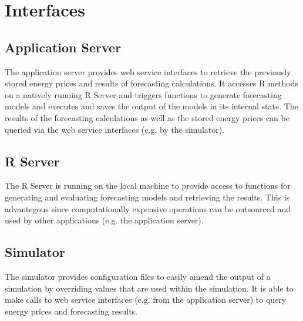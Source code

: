\documentclass[paper=a4, fontsize=11pt]{scrartcl} %
\numberwithin{equation}{section} %
\numberwithin{figure}{section} %
\numberwithin{table}{section} %
\begin{document}
\section{Interfaces}


\subsection{Application Server}

The application server provides web service interfaces to retrieve the previously stored energy prices and results of forecasting calculations. It accesses R methods on a natively running R Server and triggers functions to generate forecasting models and executes and saves the output of the models in its internal state. The results of the forecasting calculations as well as the stored energy prices can be queried via the web service interfaces (e.g. by the simulator). 


\subsection{R Server}

The R Server is running on the local machine to provide access to functions for generating and evaluating forecasting models and retrieving the results. This is advantegous since computationally expensive operations can be outsourced and used by other applications (e.g. the application server). 


\subsection{Simulator}

The simulator provides configuration files to easily amend the output of a simulation by overriding values that are used within the simulation. It is able to make calls to web service interfaces (e.g. from the application server) to query energy prices and forecasting results. 


\end{document}
